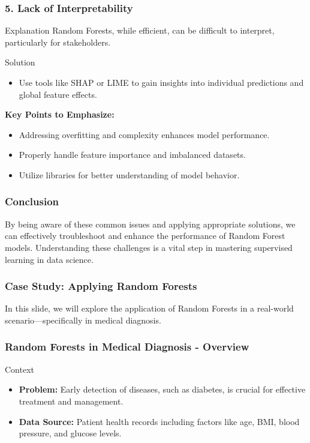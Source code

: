 \documentclass[aspectratio=169]{beamer}
\begin{document}
\begin{frame}
    \frametitle{5. Lack of Interpretability}
    \begin{block}{Explanation}
        Random Forests, while efficient, can be difficult to interpret, particularly for stakeholders.
    \end{block}
    \begin{block}{Solution}
        \begin{itemize}
            \item Use tools like SHAP or LIME to gain insights into individual predictions and global feature effects.
        \end{itemize}
    \end{block}
    \textbf{Key Points to Emphasize:}
    \begin{itemize}
        \item Addressing overfitting and complexity enhances model performance.
        \item Properly handle feature importance and imbalanced datasets.
        \item Utilize libraries for better understanding of model behavior.
    \end{itemize}
\end{frame}

\begin{frame}
    \frametitle{Conclusion}
    By being aware of these common issues and applying appropriate solutions, we can effectively troubleshoot and enhance the performance of Random Forest models.
    Understanding these challenges is a vital step in mastering supervised learning in data science.
\end{frame}

\begin{frame}[fragile]
    \frametitle{Case Study: Applying Random Forests}
    In this slide, we will explore the application of Random Forests in a real-world scenario—specifically in medical diagnosis.
\end{frame}

\begin{frame}[fragile]
    \frametitle{Random Forests in Medical Diagnosis - Overview}
    \begin{block}{Context}
        \begin{itemize}
            \item \textbf{Problem:} Early detection of diseases, such as diabetes, is crucial for effective treatment and management.
            \item \textbf{Data Source:} Patient health records including factors like age, BMI, blood pressure, and glucose levels.
        \end{itemize}
    \end{block}
\end{frame}
\end{document}
